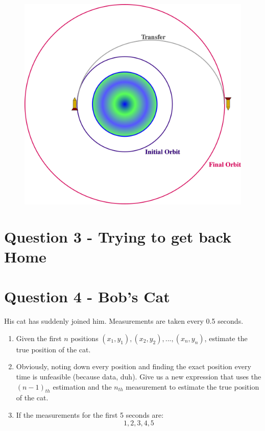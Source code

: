 \documentclass[a4paper, 12pt]{exam}
\begin{document}
	\begin{figure}[h!]
		\centering
		\includegraphics[scale = 0.8]{Q2_Transfer_Image.png}
	\end{figure}
	
	\pagebreak
	
	\section*{Question 3 - Trying to get back Home}
	
	
	\pagebreak
	\section*{Question 4 - Bob's Cat}
	His cat has suddenly joined him. Measurements are taken every 0.5 seconds.
	\begin{enumerate}[label = (\alph*)]
		\item Given the first $n$ positions ${(x_1, y_1), (x_2, y_2), ... , (x_n, y_n)}$, estimate the true position of the cat.
		\item Obviously, noting down every position and finding the exact position every time is unfeasible (because data, duh). Give us a new expression that uses the $(n-1)_{th}$ estimation and the $n_{th}$ measurement to estimate the true position of the cat.
		\item If the measurements for the first 5 seconds are:
		\begin{equation*}
			1,2,3,4,5
		\end{equation*}
	\end{enumerate}
	
	
\end{document}
